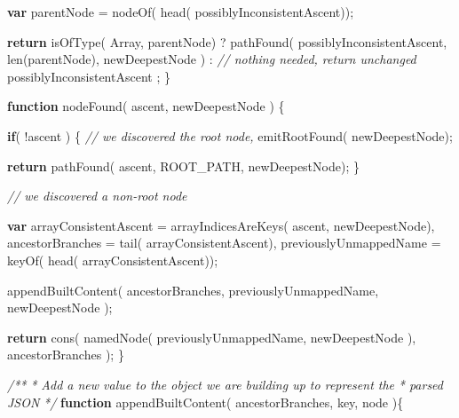 \documentclass[12pt, ]{article}
\newenvironment{Shaded}{}{}
\newcommand{\KeywordTok}[1]{\textcolor[rgb]{0.00,0.44,0.13}{\textbf{{#1}}}}
\newcommand{\CommentTok}[1]{\textcolor[rgb]{0.38,0.63,0.69}{\textit{{#1}}}}
\newcommand{\FunctionTok}[1]{\textcolor[rgb]{0.02,0.16,0.49}{{#1}}}
\newcommand{\NormalTok}[1]{{#1}}
\begin{document}
\begin{Shaded}
\begin{Highlighting}[]
      \KeywordTok{var} \NormalTok{parentNode = }\FunctionTok{nodeOf}\NormalTok{( }\FunctionTok{head}\NormalTok{( possiblyInconsistentAscent));}
      
      \KeywordTok{return}      \FunctionTok{isOfType}\NormalTok{( Array, parentNode)}
               \NormalTok{?}
                  \FunctionTok{pathFound}\NormalTok{(  possiblyInconsistentAscent, }
                              \FunctionTok{len}\NormalTok{(parentNode), }
                              \NormalTok{newDeepestNode}
                  \NormalTok{)}
               \NormalTok{:  }
                  \CommentTok{// nothing needed, return unchanged}
                  \NormalTok{possiblyInconsistentAscent }
               \NormalTok{;}
   \NormalTok{\}}
                 
   \KeywordTok{function} \FunctionTok{nodeFound}\NormalTok{( ascent, newDeepestNode ) \{}
      
      \KeywordTok{if}\NormalTok{( !ascent ) \{}
         \CommentTok{// we discovered the root node,         }
         \FunctionTok{emitRootFound}\NormalTok{( newDeepestNode);}
                    
         \KeywordTok{return} \FunctionTok{pathFound}\NormalTok{( ascent, ROOT_PATH, newDeepestNode);         }
      \NormalTok{\}}

      \CommentTok{// we discovered a non-root node}
                 
      \KeywordTok{var} \NormalTok{arrayConsistentAscent  = }\FunctionTok{arrayIndicesAreKeys}\NormalTok{( ascent, newDeepestNode),      }
          \NormalTok{ancestorBranches       = }\FunctionTok{tail}\NormalTok{( arrayConsistentAscent),}
          \NormalTok{previouslyUnmappedName = }\FunctionTok{keyOf}\NormalTok{( }\FunctionTok{head}\NormalTok{( arrayConsistentAscent));}
          
      \FunctionTok{appendBuiltContent}\NormalTok{( }
         \NormalTok{ancestorBranches, }
         \NormalTok{previouslyUnmappedName, }
         \NormalTok{newDeepestNode }
      \NormalTok{);}
                                                                                                         
      \KeywordTok{return} \FunctionTok{cons}\NormalTok{( }
               \FunctionTok{namedNode}\NormalTok{( previouslyUnmappedName, newDeepestNode ), }
               \NormalTok{ancestorBranches}
      \NormalTok{);                                                                          }
   \NormalTok{\}}


   \CommentTok{/**}
\CommentTok{    * Add a new value to the object we are building up to represent the}
\CommentTok{    * parsed JSON}
\CommentTok{    */}
   \KeywordTok{function} \FunctionTok{appendBuiltContent}\NormalTok{( ancestorBranches, key, node )\{}
     

\end{Highlighting}
\end{Shaded}
\end{document}
